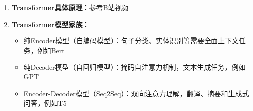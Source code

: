 \documentclass[../main.tex]{subfiles}
\begin{document}
\begin{enumerate}
\begin{itemize}
\begin{itemize}
\begin{enumerate}
                \item \textbf{更高的性能}
            \end{enumerate}            
            \item \textbf{核心局限性}
            \begin{enumerate}
                \item 信息瓶颈：细胞状态和隐藏状态都必须将整个长序列上下文压缩
                \item 训练速度慢：训练过程必须按顺序进行，无法利用GPU并行计算能力
                \item 计算复杂度高：比Transformer还高
            \end{enumerate}
        \end{itemize}
    \end{itemize}
    \item \textbf{Transformer具体原理：}参考\href{https://www.bilibili.com/video/BV13z421U7cs/?spm_id_from=333.337.search-card.all.click&vd_source=5deca47094767260f853b759a625a68f}{B站视频}
    \item \textbf{Transformer模型家族：}
    \begin{itemize}
        \item 纯Encoder模型（自编码模型）：句子分类、实体识别等需要全面上下文任务，例如Bert
        \item 纯Decoder模型（自回归模型）：掩码自注意力机制，文本生成任务，例如GPT
        \item Encoder-Decoder模型（Seq2Seq）：双向注意力理解，翻译、摘要和生成式问答，例如T5
    \end{itemize}
  
\end{enumerate}
\end{document}
